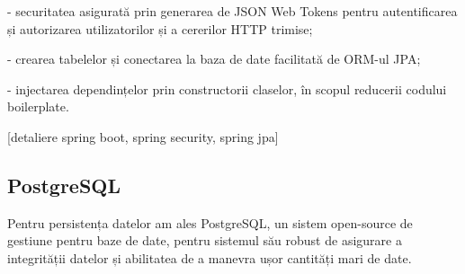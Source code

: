 - securitatea asigurată prin generarea de JSON Web Tokens pentru autentificarea și autorizarea utilizatorilor și a cererilor HTTP trimise;

- crearea tabelelor și conectarea la baza de date facilitată de ORM-ul JPA;

- injectarea dependințelor prin constructorii claselor, în scopul reducerii codului boilerplate.

[detaliere spring boot, spring security, spring jpa]

\subsection{PostgreSQL}

Pentru persistența datelor am ales PostgreSQL, un sistem open-source de gestiune pentru baze de date, pentru sistemul său robust de asigurare a integrității datelor și abilitatea de a manevra ușor cantități mari de date.